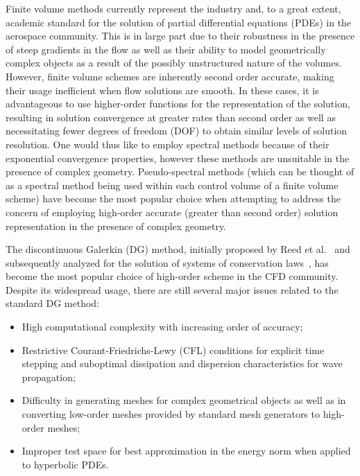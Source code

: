 \documentclass[12pt,Bold,letterpaper,TexShade]{mcgilletdclass}
\numberwithin{equation}{section}
\begin{document}
Finite volume methods currently represent the industry and, to a great extent, academic standard for the solution of partial differential equations (PDEs) in the aerospace community. This is in large part due to their robustness in the presence of steep gradients in the flow as well as their ability to model geometrically complex objects as a result of the possibly unstructured nature of the volumes. However, finite volume schemes are inherently second order accurate, making their usage inefficient when flow solutions are smooth. In these cases, it is advantageous to use higher-order functions for the representation of the solution, resulting in solution convergence at greater rates than second order as well as necessitating fewer degrees of freedom (DOF) to obtain similar levels of solution resolution. One would thus like to employ spectral methods because of their exponential convergence properties, however these methods are unsuitable in the presence of complex geometry. Pseudo-spectral methods (which can be thought of as a spectral method being used within each control volume of a finite volume scheme) have become the most popular choice when attempting to address the concern of employing high-order accurate (greater than second order) solution representation in the presence of complex geometry. 

The discontinuous Galerkin (DG) method, initially proposed by Reed et al.~\cite{reed1973} and subsequently analyzed for the solution of systems of conservation laws~\cite{cockburn1991,cockburn1989a,cockburn1989b,cockburn1990,cockburn1998}, has become the most popular choice of high-order scheme in the CFD community.  Despite its widespread usage, there are still several major issues related to the standard DG method:

\begin{itemize}
\item High computational complexity with increasing order of accuracy;
\item Restrictive Courant-Friedrichs-Lewy (CFL) conditions for explicit time stepping and suboptimal dissipation and dispersion characteristics for wave propagation;
\item Difficulty in generating meshes for complex geometrical objects as well as in converting low-order meshes provided by standard mesh generators to high-order meshes;
\item Improper test space for best approximation in the energy norm when applied to hyperbolic PDEs. %
\end{itemize}
\end{document}
